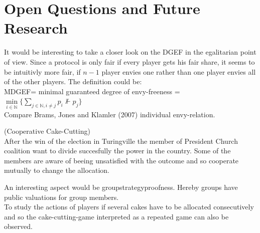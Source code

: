 \section{Open Questions and Future Research}
It would be interesting to take a closer look on the DGEF in the egalitarian point of view. Since a protocol is only fair if every player gets his fair share, it seems to be intuitivly more fair, if $n-1$ player envies one rather than one player envies all of the other players. The definition could be:\\
MDGEF= minimal guaranteed degree of envy-freeness = $\min\limits_{i\in \mathbb{N}}\{\sum\limits_{j\in\mathbb{N},i \neq j} p_i \nVdash p_j\}$\\ Compare Brams, Jones and Klamler (2007) individual envy-relation.\\
\newline
\begin{bsp}
\label{bsp2}
(Cooperative Cake-Cutting)\\
After the win of the election in Turingville the member of President Church coalition want to divide succesfully the power in the country. Some of the members are aware of beeing unsatisfied with the outcome and so cooperate mutually to change the allocation.
\end{bsp}
An interesting aspect would be groupstrategyproofness. Hereby groups have public valuations for group members.\\
To study the actions of players if several cakes have to be allocated consecutively and so the cake-cutting-game interpreted as a repeated game can also be observed.

\pagebreak


\clearpage




\clearpage

\listoffigures

\listoftables


